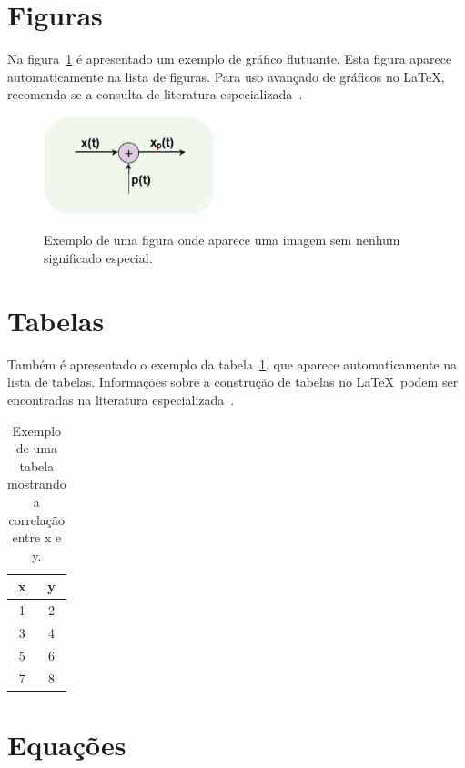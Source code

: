 \documentclass[openright]{normas-utf-tex} %
\begin{document}
\section{Figuras}
\label{sec:figuras}

Na figura~\ref{fig:dummy} é apresentado um exemplo de gráfico flutuante. Esta figura aparece automaticamente na lista de figuras. Para uso avançado de gráficos no \LaTeX, recomenda-se a consulta de literatura especializada~\cite{Goossens2007}.

\begin{figure}[!htb]
	\centering
	\caption[Exemplo de uma figura]{Exemplo de uma figura onde aparece uma imagem sem nenhum significado especial.}
	\includegraphics[width=5cm]{./dummy.eps} %
	\label{fig:dummy}
\end{figure}


\section{Tabelas}
\label{sec:tabelas}

Também é apresentado o exemplo da tabela~\ref{tab:correlacao}, que aparece automaticamente na lista de tabelas. Informações sobre a construção de tabelas no \LaTeX\ podem ser encontradas na literatura especializada~\cite{Lamport1986,Buerger1989,Kopka2003,Mittelbach2004}.

\begin{table}[!htb]
	\centering
	\caption[Exemplo de uma tabela]{Exemplo de uma tabela mostrando a correlação entre x e y.}
	\label{tab:correlacao}
	\begin{tabular}{cc}
		\hline
		x & y \\
		\hline
		1 & 2 \\
		3 & 4 \\
		5 & 6 \\
		7 & 8 \\
		\hline
	\end{tabular}
\end{table}



\section{Equações}
\label{sec:equacoes}
\end{document}
